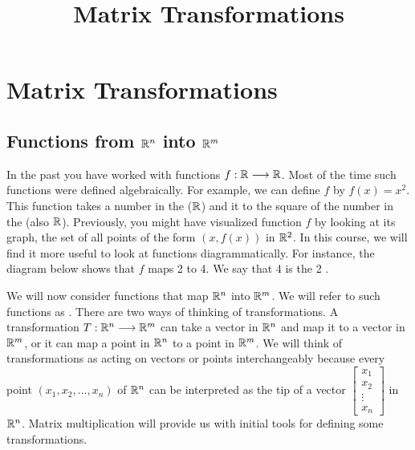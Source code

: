 \documentclass{ximera}
\title{Matrix Transformations} \license{CC BY-NC-SA 4.0}
\begin{document}
\begin{abstract}
\end{abstract}
\maketitle
\section*{Matrix Transformations}
\subsection*{Functions from $\mathbb{R}^n$ into $\mathbb{R}^m$}
In the past you have worked with functions $f:\mathbb{R}\longrightarrow \mathbb{R}$.  Most of the time such functions were defined algebraically.  For example, we can define $f$ by $f(x)=x^2$.  This function takes a number in the  ($\mathbb{R}$) and  it to the square of the number in the  (also $\mathbb{R}$).  Previously, you might have visualized function $f$ by looking at its graph, the set of all points of the form $(x, f(x))$ in $\mathbb{R}^2$.  In this course, we will find it more useful to look at functions diagrammatically.  For instance, the diagram below shows that $f$ maps 2 to 4.  We say that 4 is the  2 .
\begin{center}
\end{center}

We will now consider functions that map $\mathbb{R}^n$ into $\mathbb{R}^m$.  We will refer to such functions as .  There are two ways of thinking of transformations.  A transformation $T:\mathbb{R}^n\longrightarrow\mathbb{R}^m$ can take a vector in $\mathbb{R}^n$ and map it to a vector in $\mathbb{R}^m$, or it can map a point in $\mathbb{R}^n$ to a point in $\mathbb{R}^m$.  We will think of transformations as acting on vectors or points interchangeably because every point $(x_1, x_2,\dots ,x_n)$ of $\mathbb{R}^n$ can be interpreted as the tip of a vector $\begin{bmatrix}x_1\\x_2\\\vdots\\x_n\end{bmatrix}$ in $\mathbb{R}^n$.  Matrix multiplication will provide us with initial tools for defining some transformations.
\end{document}
